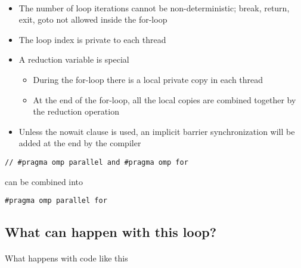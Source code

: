 \documentclass[%
oneside,                 %
final,                   %
10pt]{article}
\begin{document}
\paragraph{}
\begin{itemize}
\item The number of loop iterations cannot be non-deterministic; break, return, exit, goto not allowed inside the for-loop

\item The loop index is private to each thread

\item A reduction variable is special
\begin{itemize}

  \item During the for-loop there is a local private copy in each thread

  \item At the end of the for-loop, all the local copies are combined together by the reduction operation

\end{itemize}

\noindent
\item Unless the nowait clause is used, an implicit barrier synchronization will be added at the end by the compiler
\end{itemize}

\noindent


\begin{verbatim}
// #pragma omp parallel and #pragma omp for

\end{verbatim}

can be combined into


\begin{verbatim}
#pragma omp parallel for

\end{verbatim}



\subsection*{What can happen with this loop?}


\paragraph{}
What happens with code like this 
\end{document}
